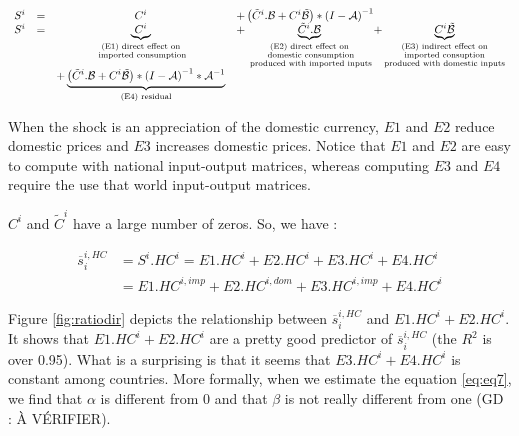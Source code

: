 \documentclass[11pt,a4paper]{article}
\begin{document}
\begin{equation}
\begin{array}{lccl}
	S^ i&=&C^i	&+ \left(\tilde{C}^i.{\cal B}+{C^i}{\tilde{{\cal B}}}\right)*{{(I-{\cal A})}^{-1}} \\
	S^i &=&\underbrace{C^i}_{\substack{\text{(E1) direct effect on} \\ \text{ imported consumption}}}&+ \underbrace{\tilde{C}^i.{\cal B}}_{\substack{\text{(E2) direct effect on} \\ \text{ domestic consumption} \\ \text{ produced with  imported inputs}}}  + \underbrace{{C^i}{\tilde{{\cal B}}}}_{\substack{\text{(E3) indirect effect on} \\ \text{imported consuption} \\ \text{produced with domestic inputs}}} \\ &&+\underbrace {\left( \tilde{C}^i.{\cal B} + {C^i}{\tilde{{\cal B}}}\right)*{{(I-{\cal A})}^{-1}}*{\cal A}^{-1}}_{\text{(E4) residual}} \\
\end{array}
\end{equation}

When the shock is an appreciation of the domestic currency, $E1$ and $E2$ reduce domestic prices and $E3$ increases domestic prices. Notice that $E1$ and $E2$ are easy to compute with national input-output matrices, whereas computing $E3$ and $E4$ require the use that world input-output matrices.

$C^i$ and $\tilde{C}^i$ have a large number of zeros. So, we have :

\begin{equation}
\begin{array}{lccl}
\overline{s}_{i}^{i,HC}&=S^i.HC^i=E1.HC^i+E2.HC^i+E3.HC^i+E4.HC^i \\
&=E1.HC^{i,imp}+E2.HC^{i,dom}+E3.HC^{i,imp}+E4.HC^i
 \end{array} 
 \end{equation}

 
Figure \ref{fig:ratiodir} depicts the relationship between $\overline{s}_{i}^{i,HC}$ and $E1.HC^i+E2.HC^i$. It shows that $E1.HC^i+E2.HC^i$ are a pretty good predictor of $\overline{s}_{i}^{i,HC}$ (the $R^2$ is over 0.95). What is a surprising is that it seems that $E3.HC^i+E4.HC^i$ is constant among countries. 
More formally, when we estimate the  equation \ref{eq:eq7}, we find that $\alpha$ is different from 0 and that $\beta$ is not really different from one (GD : À VÉRIFIER).
\end{document}

